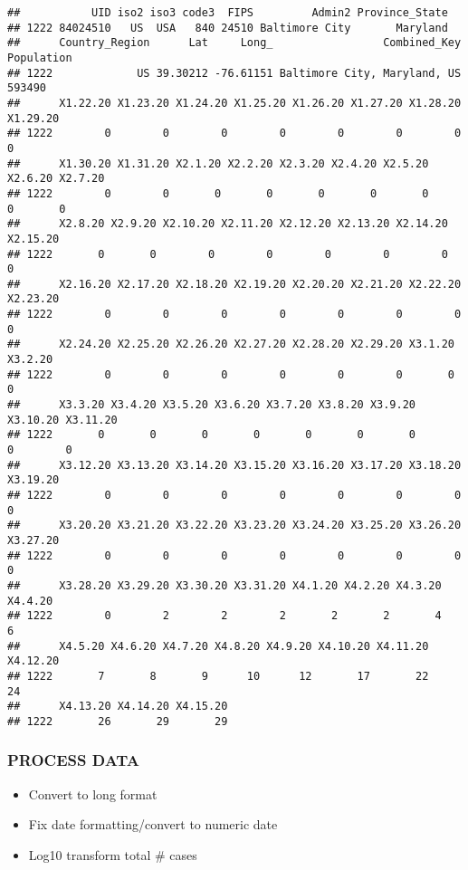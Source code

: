 \documentclass[]{article}
\providecommand{\tightlist}{%
  \setlength{\itemsep}{0pt}\setlength{\parskip}{0pt}}
\begin{document}
\begin{verbatim}
##           UID iso2 iso3 code3  FIPS         Admin2 Province_State
## 1222 84024510   US  USA   840 24510 Baltimore City       Maryland
##      Country_Region      Lat     Long_                 Combined_Key Population
## 1222             US 39.30212 -76.61151 Baltimore City, Maryland, US     593490
##      X1.22.20 X1.23.20 X1.24.20 X1.25.20 X1.26.20 X1.27.20 X1.28.20 X1.29.20
## 1222        0        0        0        0        0        0        0        0
##      X1.30.20 X1.31.20 X2.1.20 X2.2.20 X2.3.20 X2.4.20 X2.5.20 X2.6.20 X2.7.20
## 1222        0        0       0       0       0       0       0       0       0
##      X2.8.20 X2.9.20 X2.10.20 X2.11.20 X2.12.20 X2.13.20 X2.14.20 X2.15.20
## 1222       0       0        0        0        0        0        0        0
##      X2.16.20 X2.17.20 X2.18.20 X2.19.20 X2.20.20 X2.21.20 X2.22.20 X2.23.20
## 1222        0        0        0        0        0        0        0        0
##      X2.24.20 X2.25.20 X2.26.20 X2.27.20 X2.28.20 X2.29.20 X3.1.20 X3.2.20
## 1222        0        0        0        0        0        0       0       0
##      X3.3.20 X3.4.20 X3.5.20 X3.6.20 X3.7.20 X3.8.20 X3.9.20 X3.10.20 X3.11.20
## 1222       0       0       0       0       0       0       0        0        0
##      X3.12.20 X3.13.20 X3.14.20 X3.15.20 X3.16.20 X3.17.20 X3.18.20 X3.19.20
## 1222        0        0        0        0        0        0        0        0
##      X3.20.20 X3.21.20 X3.22.20 X3.23.20 X3.24.20 X3.25.20 X3.26.20 X3.27.20
## 1222        0        0        0        0        0        0        0        0
##      X3.28.20 X3.29.20 X3.30.20 X3.31.20 X4.1.20 X4.2.20 X4.3.20 X4.4.20
## 1222        0        2        2        2       2       2       4       6
##      X4.5.20 X4.6.20 X4.7.20 X4.8.20 X4.9.20 X4.10.20 X4.11.20 X4.12.20
## 1222       7       8       9      10      12       17       22       24
##      X4.13.20 X4.14.20 X4.15.20
## 1222       26       29       29
\end{verbatim}

\subsubsection{PROCESS DATA}\label{process-data}

\begin{itemize}
\tightlist
\item
  Convert to long format\\
\item
  Fix date formatting/convert to numeric date\\
\item
  Log10 transform total \# cases
\end{itemize}
\end{document}
